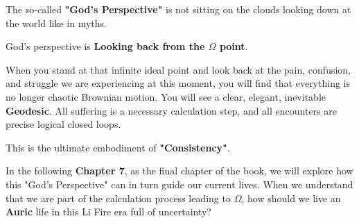 The so-called \textbf{"God's Perspective"} is not sitting on the clouds looking down at the world like in myths.

God's perspective is \textbf{Looking back from the $\Omega$ point}.

When you stand at that infinite ideal point and look back at the pain, confusion, and struggle we are experiencing at this moment, you will find that everything is no longer chaotic Brownian motion. You will see a clear, elegant, inevitable \textbf{Geodesic}. All suffering is a necessary calculation step, and all encounters are precise logical closed loops.

This is the ultimate embodiment of \textbf{"Consistency"}.

In the following \textbf{Chapter 7}, as the final chapter of the book, we will explore how this "God's Perspective" can in turn guide our current lives. When we understand that we are part of the calculation process leading to \textbf{$\Omega$}, how should we live an \textbf{Auric} life in this Li Fire era full of uncertainty?

